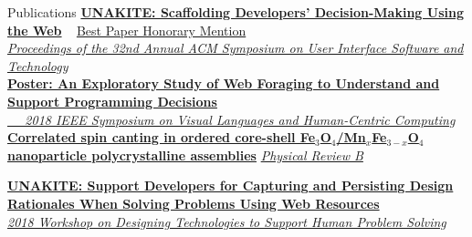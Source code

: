 \documentclass{resume}
\begin{document}
\begin{rSection}{Publications}
{\href{http://www.cs.cmu.edu/~NatProg/papers/p67-liu-Unakite-UIST.pdf}{\bf UNAKITE: Scaffolding Developers’ Decision-Making Using the Web} ~ \underline{Best Paper Honorary Mention}} \\
{\em  \href{https://dl.acm.org/citation.cfm?id=3347908}{\hfill Proceedings of the 32nd Annual ACM Symposium on User Interface Software and Technology}} \\
\small
\href{http://www.cs.cmu.edu/~NatProg/papers/p305-hsieh.pdf}{\bf Poster: An Exploratory Study of Web Foraging to Understand and Support Programming Decisions }\\
\normalsize
\href{https://ieeexplore.ieee.org/document/8506517}{\em ~~ \hfill  2018 IEEE Symposium on Visual Languages and Human-Centric Computing} \\
{\href{https://janeon.github.io/assets/img/PhysRevB.99.094421.pdf}{\bf Correlated spin canting in ordered core-shell Fe$_3$O$_4$/Mn$_x$Fe$_{3-x}$O$_4$ nanoparticle polycrystalline assemblies} \hfill \href{https://journals.aps.org/prb/abstract/10.1103/PhysRevB.99.094421}{\em Physical Review B}}

\small
{\href{http://www.cs.cmu.edu/~NatProg/papers/DTSHPS%20paper%207%20-%20one-page-summary-with-references%20v2.pdf}{\bf UNAKITE: Support Developers for Capturing and Persisting Design Rationales When Solving Problems Using Web Resources} ~~~~~~~~~ \href{https://digital.lib.washington.edu/researchworks/bitstream/handle/1773/42857/DTSHPS18-Proceedings-final%20v2.pdf}{\em 2018 Workshop on Designing Technologies to Support Human Problem Solving}}
\end{rSection} \normalsize
\end{document}
